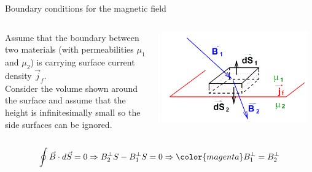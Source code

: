 \begin{frame}{Boundary conditions for the magnetic field}

\begin{columns}
  \begin{column}{0.50\textwidth}
  {\small
     Assume that the boundary between two materials (with
     permeabilities $\mu_1$ and  $\mu_2$)
     is carrying surface current density $\vec{j}_f$.\\
     Consider the volume shown around the surface and
     assume that the height is infinitesimally small so the side
     surfaces can be ignored.
  }
  \end{column}
  \begin{column}{0.50\textwidth}
    \begin{center}
      \includegraphics[width=0.95\textwidth]{./images/schematics/boundary_conditions_magnetic_field_1.png}\\
    \end{center}
  \end{column}
\end{columns}

\begin{equation*}
  \oint \vec{B} \cdot d\vec{S} = 0 \Rightarrow
       B_2^{\perp} S - B_1^{\perp} S = 0 \Rightarrow
         {\color{magenta} B_1^{\perp} = B_2^{\perp}}
\end{equation*}

\end{frame}

%
%
%

